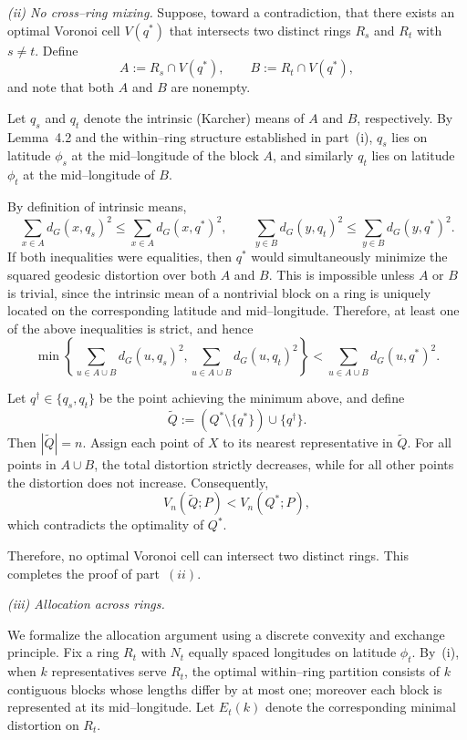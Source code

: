 \documentclass[12pt, reqno]{amsart}
\theoremstyle{plain}
\theoremstyle{definition}
\begin{document}
\smallskip
\emph{(ii) No cross–ring mixing.}
Suppose, toward a contradiction, that there exists an optimal Voronoi cell
$V(q^*)$ that intersects two distinct rings $R_s$ and $R_t$ with $s\neq t$.
Define
\[
A := R_s \cap V(q^*), \qquad B := R_t \cap V(q^*),
\]
and note that both $A$ and $B$ are nonempty.

Let $q_s$ and $q_t$ denote the intrinsic (Karcher) means of $A$ and $B$, respectively.
By Lemma~4.2 and the within--ring structure established in part~(i), $q_s$ lies on
latitude $\phi_s$ at the mid--longitude of the block $A$, and similarly $q_t$
lies on latitude $\phi_t$ at the mid--longitude of $B$.

By definition of intrinsic means,
\[
\sum_{x\in A} d_G(x,q_s)^2 \le \sum_{x\in A} d_G(x,q^*)^2,
\qquad
\sum_{y\in B} d_G(y,q_t)^2 \le \sum_{y\in B} d_G(y,q^*)^2.
\]
If both inequalities were equalities, then $q^*$ would simultaneously minimize
the squared geodesic distortion over both $A$ and $B$.
This is impossible unless $A$ or $B$ is trivial, since the intrinsic mean of a
nontrivial block on a ring is uniquely located on the corresponding latitude and
mid--longitude.
Therefore, at least one of the above inequalities is strict, and hence
\[
\min\!\left\{
\sum_{u\in A\cup B} d_G(u,q_s)^2,
\sum_{u\in A\cup B} d_G(u,q_t)^2
\right\}
<
\sum_{u\in A\cup B} d_G(u,q^*)^2.
\]

Let $q^\dagger\in\{q_s,q_t\}$ be the point achieving the minimum above, and define
\[
\widetilde Q := (Q^*\setminus\{q^*\})\cup\{q^\dagger\}.
\]
Then $|\widetilde Q|=n$.
Assign each point of $X$ to its nearest representative in $\widetilde Q$.
For all points in $A\cup B$, the total distortion strictly decreases, while for
all other points the distortion does not increase.
Consequently,
\[
V_n(\widetilde Q;P) < V_n(Q^*;P),
\]
which contradicts the optimality of $Q^*$.

Therefore, no optimal Voronoi cell can intersect two distinct rings.
This completes the proof of part~$(ii)$.

\smallskip
\emph{(iii) Allocation across rings.}

We formalize the allocation argument using a discrete convexity and exchange principle. Fix a ring $R_t$ with $N_t$ equally spaced longitudes on latitude $\phi_t$. By~(i), when $k$ representatives serve $R_t$, the optimal within–ring partition consists of $k$ contiguous blocks whose lengths differ by at most one; moreover each block is represented at its mid–longitude. Let $E_t(k)$ denote the corresponding minimal distortion on $R_t$.
\end{document}
